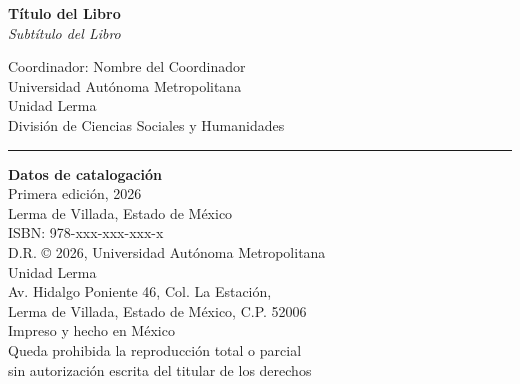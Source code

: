 \clearpage

\begin{titlepage}
    \thispagestyle{empty}
    \pagestyle{empty}
    
    \vspace*{2cm}
    
    \begin{center}
        \textbf{Título del Libro} \\
        \textit{Subtítulo del Libro} \\
        \vspace{0.5cm}
        
        \small
        Coordinador: Nombre del Coordinador \\
        Universidad Autónoma Metropolitana \\
        Unidad Lerma \\
        División de Ciencias Sociales y Humanidades \\
        \vspace{1cm}
        
        \rule{0.6\textwidth}{0.4pt}
        \vspace{0.5cm}
        
        \small
        \textbf{Datos de catalogación} \\
        \vspace{0.3cm}
        Primera edición, 2026 \\
        Lerma de Villada, Estado de México \\
        \vspace{0.3cm}
        ISBN: 978-xxx-xxx-xxx-x \\
        D.R. © 2026, Universidad Autónoma Metropolitana \\
        Unidad Lerma \\
        Av. Hidalgo Poniente 46, Col. La Estación, \\
        Lerma de Villada, Estado de México, C.P. 52006 \\
        \vspace{0.3cm}
        Impreso y hecho en México \\
        \vspace{0.3cm}
        Queda prohibida la reproducción total o parcial \\
        sin autorización escrita del titular de los derechos
    \end{center}
\end{titlepage}

\pagestyle{plain}
\setcounter{page}{1}  %